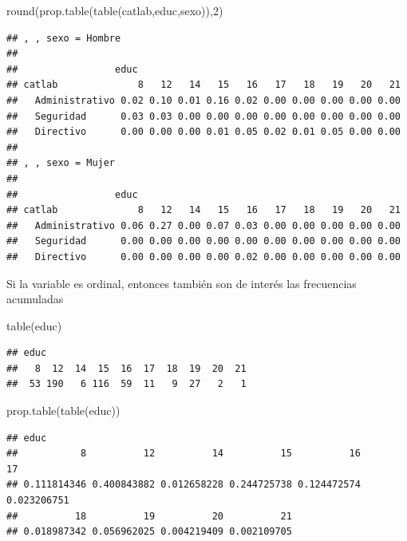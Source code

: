\documentclass[
]{book}
\newenvironment{Shaded}{\begin{snugshade}}{\end{snugshade}}
\newcommand{\DecValTok}[1]{\textcolor[rgb]{0.00,0.00,0.81}{#1}}
\newcommand{\FunctionTok}[1]{\textcolor[rgb]{0.00,0.00,0.00}{#1}}
\newcommand{\NormalTok}[1]{#1}
\theoremstyle{break}
\theoremstyle{nonumberplain}
\begin{document}
\begin{Shaded}
\begin{Highlighting}[]
\FunctionTok{round}\NormalTok{(}\FunctionTok{prop.table}\NormalTok{(}\FunctionTok{table}\NormalTok{(catlab,educ,sexo)),}\DecValTok{2}\NormalTok{)}
\end{Highlighting}
\end{Shaded}

\begin{verbatim}
## , , sexo = Hombre
## 
##                 educ
## catlab              8   12   14   15   16   17   18   19   20   21
##   Administrativo 0.02 0.10 0.01 0.16 0.02 0.00 0.00 0.00 0.00 0.00
##   Seguridad      0.03 0.03 0.00 0.00 0.00 0.00 0.00 0.00 0.00 0.00
##   Directivo      0.00 0.00 0.00 0.01 0.05 0.02 0.01 0.05 0.00 0.00
## 
## , , sexo = Mujer
## 
##                 educ
## catlab              8   12   14   15   16   17   18   19   20   21
##   Administrativo 0.06 0.27 0.00 0.07 0.03 0.00 0.00 0.00 0.00 0.00
##   Seguridad      0.00 0.00 0.00 0.00 0.00 0.00 0.00 0.00 0.00 0.00
##   Directivo      0.00 0.00 0.00 0.00 0.02 0.00 0.00 0.00 0.00 0.00
\end{verbatim}

Si la variable es ordinal, entonces también son de interés las
frecuencias acumuladas

\begin{Shaded}
\begin{Highlighting}[]
\FunctionTok{table}\NormalTok{(educ)}
\end{Highlighting}
\end{Shaded}

\begin{verbatim}
## educ
##   8  12  14  15  16  17  18  19  20  21 
##  53 190   6 116  59  11   9  27   2   1
\end{verbatim}

\begin{Shaded}
\begin{Highlighting}[]
\FunctionTok{prop.table}\NormalTok{(}\FunctionTok{table}\NormalTok{(educ))}
\end{Highlighting}
\end{Shaded}

\begin{verbatim}
## educ
##           8          12          14          15          16          17 
## 0.111814346 0.400843882 0.012658228 0.244725738 0.124472574 0.023206751 
##          18          19          20          21 
## 0.018987342 0.056962025 0.004219409 0.002109705
\end{verbatim}
\end{document}
